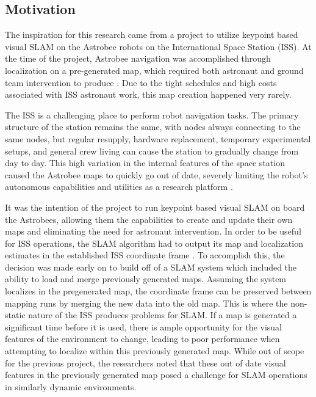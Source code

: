 \subsection{Motivation}

The inspiration for this research came from a project to utilize keypoint based visual SLAM on the Astrobee robots on the International Space Station (ISS). At the time of the project, Astrobee navigation was accomplished through localization on a pre-generated map, which required both astronaut and ground team intervention to produce \cite{soussanAstroLocEfficientRobust2022}. Due to the tight schedules and high costs associated with ISS astronaut work, this map creation happened very rarely.

The ISS is a challenging place to perform robot navigation tasks. The primary structure of the station remains the same, with nodes always connecting to the same nodes, but regular resupply, hardware replacement, temporary experimental setups, and general crew living can cause the station to gradually change from day to day. This high variation in the internal features of the space station caused the Astrobee maps to quickly go out of date, severely limiting the robot's autonomous capabilities and utilities as a research platform \cite{PLACEHOLDER}.

It was the intention of the project to run keypoint based visual SLAM on board the Astrobees, allowing them the capabilities to create and update their own maps and eliminating the need for astronaut intervention. In order to be useful for ISS operations, the SLAM algorithm had to output its map and localization estimates in the established ISS coordinate frame \cite{PLACEHOLDER}. To accomplish this, the decision was made early on to build off of a SLAM system which included the ability to load and merge previously generated maps. Assuming the system localizes in the pregenerated map, the coordinate frame can be preserved between mapping runs by merging the new data into the old map. This is where the non-static nature of the ISS produces problems for SLAM. If a map is generated a significant time before it is used, there is ample opportunity for the visual features of the environment to change, leading to poor performance when attempting to localize within this previously generated map. While out of scope for the previous project, the researchers noted that these out of date visual features in the previously generated map posed a challenge for SLAM operations in similarly dynamic environments.

